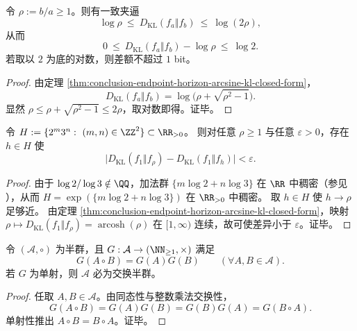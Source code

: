 \begin{corollary}\label{cor:conclusion-endpoint-horizon-kl-vs-log-cost-onebit}
令 \(\rho:=b/a\ge 1\)。则有一致夹逼
\[
\log\rho\ \le\ D_{\mathrm{KL}}(f_a\Vert f_b)\ \le\ \log(2\rho),
\]
从而
\[
0\ \le\ D_{\mathrm{KL}}(f_a\Vert f_b)-\log\rho\ \le\ \log 2.
\]
若取以 \(2\) 为底的对数，则差额不超过 \(1\) bit。
\end{corollary}

\begin{proof}
由定理 \ref{thm:conclusion-endpoint-horizon-arcsine-kl-closed-form}，
\[
D_{\mathrm{KL}}(f_a\Vert f_b)=\log\bigl(\rho+\sqrt{\rho^2-1}\bigr).
\]
显然 \(\rho\le \rho+\sqrt{\rho^2-1}\le 2\rho\)，取对数即得。证毕。
\end{proof}

\begin{proposition}\label{prop:conclusion-endpoint-horizon-two-prime-approx}
令 \(H:=\{2^m3^n:\ (m,n)\in\ZZ^2\}\subset\RR_{>0}\)。
则对任意 \(\rho\ge 1\) 与任意 \(\varepsilon>0\)，存在 \(h\in H\) 使
\[
\bigl|D_{\mathrm{KL}}(f_1\Vert f_{\rho})-D_{\mathrm{KL}}(f_1\Vert f_{h})\bigr|<\varepsilon.
\]
\end{proposition}

\begin{proof}
由于 \(\log 2/\log 3\notin\QQ\)，加法群 \(\{m\log 2+n\log 3\}\) 在 \(\RR\) 中稠密（参见 \cite{KuipersNiederreiter1974}），从而 \(H=\exp(\{m\log 2+n\log 3\})\) 在 \(\RR_{>0}\) 中稠密。
取 \(h\in H\) 使 \(h\to\rho\) 足够近。
由定理 \ref{thm:conclusion-endpoint-horizon-arcsine-kl-closed-form}，映射 \(\rho\mapsto D_{\mathrm{KL}}(f_1\Vert f_\rho)=\operatorname{arcosh}(\rho)\) 在 \([1,\infty)\) 连续，故可使差异小于 \(\varepsilon\)。证毕。
\end{proof}

\begin{proposition}\label{prop:conclusion-godel-multiplicative-homomorphism-abelianization}
令 \((\mathcal A,\circ)\) 为半群，且 \(G:\mathcal A\to(\NN_{\ge 1},\times)\) 满足
\[
G(A\circ B)=G(A)G(B)\qquad(\forall A,B\in\mathcal A).
\]
若 \(G\) 为单射，则 \(\mathcal A\) 必为交换半群。
\end{proposition}

\begin{proof}
任取 \(A,B\in\mathcal A\)。由同态性与整数乘法交换性，
\[
G(A\circ B)=G(A)G(B)=G(B)G(A)=G(B\circ A).
\]
单射性推出 \(A\circ B=B\circ A\)。证毕。
\end{proof}

